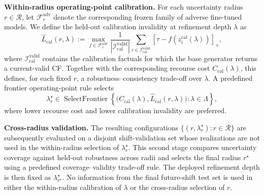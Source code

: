 \textbf{Within-radius operating-point calibration.}
For each uncertainty radius $r\in\mathcal{R}$, let
$\mathcal{F}_{r}^{\mathrm{adv}}$
denote the corresponding frozen family of adverse fine-tuned models. We define
the held-out calibration invalidity at refinement depth $\lambda$ as
\begin{equation}
\widehat L_{\mathrm{cal}}(r,\lambda)
:=
\max_{f\in\mathcal{F}_{r}^{\mathrm{adv}}}
\frac{1}{|\mathcal{I}_{\mathrm{cal}}^{\mathrm{valid}}|}
\sum_{i\in\mathcal{I}_{\mathrm{cal}}^{\mathrm{valid}}}
\left[
\tau
-
f\!\left(
z_i^{\mathrm{cal}}(\lambda)
\right)
\right]_+ ,
\label{eq:heldout_calibration_invalidity}
\end{equation}
where
$\mathcal{I}_{\mathrm{cal}}^{\mathrm{valid}}$
contains the calibration factuals for which the base generator returns a
current-valid CF. Together with the corresponding recourse cost
$C_{\mathrm{cal}}(\lambda)$, this defines, for each fixed $r$, a
robustness--\textcolor{frappe_red}{consistency} trade-off over $\lambda$. A predefined frontier
operating-point rule selects
\[
\lambda_r^\star
\in
\operatorname{SelectFrontier}
\left\{
\bigl(
C_{\mathrm{cal}}(\lambda),
\widehat L_{\mathrm{cal}}(r,\lambda)
\bigr)
:
\lambda\in\Lambda
\right\},
\]
where lower recourse cost and lower calibration invalidity are preferred.

\textbf{Cross-radius validation.}
The resulting configurations
$\{(r,\lambda_r^\star):r\in\mathcal{R}\}$
are subsequently evaluated on a disjoint shift-validation set whose
realizations are not used in the within-radius selection of
$\lambda_r^\star$. This second stage compares uncertainty coverage against
held-out robustness across radii and selects the final radius
$r^\star$ using a predefined coverage--validity trade-off rule. The deployed
refinement depth is then fixed as
$\lambda_{r^\star}^\star$.
No information from the final future-shift test set is used in either the
within-radius calibration of $\lambda$ or the cross-radius selection of $r$.

